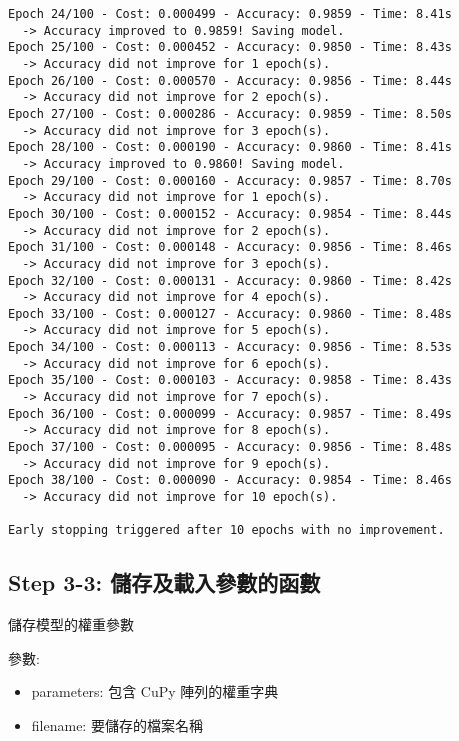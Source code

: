 \documentclass[11pt]{article}
\providecommand{\tightlist}{%
      \setlength{\itemsep}{0pt}\setlength{\parskip}{0pt}}
\begin{document}
\begin{Verbatim}[commandchars=\\\{\}]
Epoch 24/100 - Cost: 0.000499 - Accuracy: 0.9859 - Time: 8.41s
  -> Accuracy improved to 0.9859! Saving model.
Epoch 25/100 - Cost: 0.000452 - Accuracy: 0.9850 - Time: 8.43s
  -> Accuracy did not improve for 1 epoch(s).
Epoch 26/100 - Cost: 0.000570 - Accuracy: 0.9856 - Time: 8.44s
  -> Accuracy did not improve for 2 epoch(s).
Epoch 27/100 - Cost: 0.000286 - Accuracy: 0.9859 - Time: 8.50s
  -> Accuracy did not improve for 3 epoch(s).
Epoch 28/100 - Cost: 0.000190 - Accuracy: 0.9860 - Time: 8.41s
  -> Accuracy improved to 0.9860! Saving model.
Epoch 29/100 - Cost: 0.000160 - Accuracy: 0.9857 - Time: 8.70s
  -> Accuracy did not improve for 1 epoch(s).
Epoch 30/100 - Cost: 0.000152 - Accuracy: 0.9854 - Time: 8.44s
  -> Accuracy did not improve for 2 epoch(s).
Epoch 31/100 - Cost: 0.000148 - Accuracy: 0.9856 - Time: 8.46s
  -> Accuracy did not improve for 3 epoch(s).
Epoch 32/100 - Cost: 0.000131 - Accuracy: 0.9860 - Time: 8.42s
  -> Accuracy did not improve for 4 epoch(s).
Epoch 33/100 - Cost: 0.000127 - Accuracy: 0.9860 - Time: 8.48s
  -> Accuracy did not improve for 5 epoch(s).
Epoch 34/100 - Cost: 0.000113 - Accuracy: 0.9856 - Time: 8.53s
  -> Accuracy did not improve for 6 epoch(s).
Epoch 35/100 - Cost: 0.000103 - Accuracy: 0.9858 - Time: 8.43s
  -> Accuracy did not improve for 7 epoch(s).
Epoch 36/100 - Cost: 0.000099 - Accuracy: 0.9857 - Time: 8.49s
  -> Accuracy did not improve for 8 epoch(s).
Epoch 37/100 - Cost: 0.000095 - Accuracy: 0.9856 - Time: 8.48s
  -> Accuracy did not improve for 9 epoch(s).
Epoch 38/100 - Cost: 0.000090 - Accuracy: 0.9854 - Time: 8.46s
  -> Accuracy did not improve for 10 epoch(s).

Early stopping triggered after 10 epochs with no improvement.
    \end{Verbatim}

    \subsection{Step 3-3:
儲存及載入參數的函數}\label{step-3-3-ux5132ux5b58ux53caux8f09ux5165ux53c3ux6578ux7684ux51fdux6578}

儲存模型的權重參數

參數:

\begin{itemize}
\tightlist
\item
  parameters: 包含 CuPy 陣列的權重字典
\item
  filename: 要儲存的檔案名稱
\end{itemize}
\end{document}
